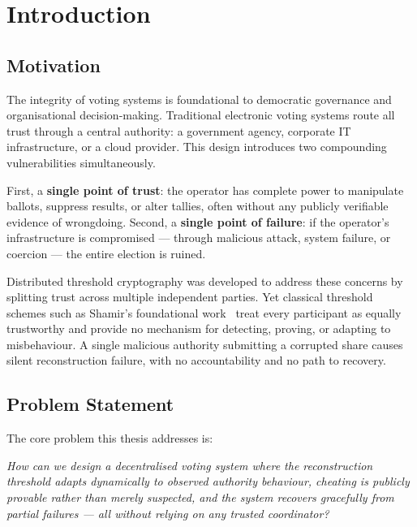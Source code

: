 \documentclass[12pt,a4paper]{article}
\theoremstyle{definition}
\theoremstyle{remark}
\begin{document}
\newpage

\section{Introduction}
\label{sec:intro}

\subsection{Motivation}

The integrity of voting systems is foundational to democratic governance and
organisational decision-making. Traditional electronic voting systems route
all trust through a central authority: a government agency, corporate IT
infrastructure, or a cloud provider.
This design introduces two compounding vulnerabilities simultaneously.

First, a \textbf{single point of trust}: the operator has complete power
to manipulate ballots, suppress results, or alter tallies, often without
any publicly verifiable evidence of wrongdoing. Second, a
\textbf{single point of failure}: if the operator's infrastructure is
compromised — through malicious attack, system failure, or coercion —
the entire election is ruined.

Distributed threshold cryptography was developed to address these concerns
by splitting trust across multiple independent parties. Yet classical
threshold schemes such as Shamir's foundational work~\cite{shamir1979}
treat every participant as equally trustworthy and provide no mechanism for
detecting, proving, or adapting to misbehaviour. A single malicious
authority submitting a corrupted share causes silent reconstruction failure,
with no accountability and no path to recovery.

\subsection{Problem Statement}

The core problem this thesis addresses is:

\begin{insight}
\textit{How can we design a decentralised voting system where the
reconstruction threshold adapts dynamically to observed authority behaviour,
cheating is publicly provable rather than merely suspected, and the
system recovers gracefully from partial failures — all without relying
on any trusted coordinator?}
\end{insight}
\end{document}
